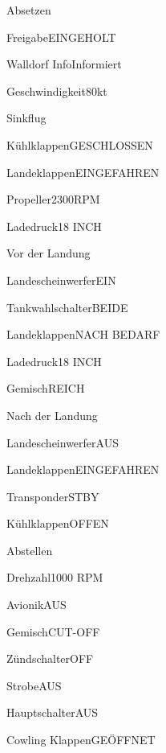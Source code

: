 \begin{task}
  \begin{checklist}{Absetzen}
    \item{Freigabe}{EINGEHOLT}
    \item{Walldorf Info}{Informiert}
    \item{Geschwindigkeit}{80kt}
  \end{checklist}
\end{task}

\begin{task}
  \begin{checklist}{Sinkflug}
    \item{Kühlklappen}{GESCHLOSSEN}
    \item{Landeklappen}{EINGEFAHREN}
    \item{Propeller}{2300RPM}
    \item{Ladedruck}{18 INCH}
    \item{}{}
  \end{checklist}
\end{task}

\begin{task}
  \begin{checklist}{Vor der Landung}
    \item{Landescheinwerfer}{EIN}
    \item{Tankwahlschalter}{BEIDE}
    \item{Landeklappen}{NACH BEDARF}
    \item{Ladedruck}{18 INCH}
    \item{Gemisch}{REICH}
  \end{checklist}
\end{task}

\begin{task}
  \begin{checklist}{Nach der Landung}
    \item{Landescheinwerfer}{AUS}
    \item{Landeklappen}{EINGEFAHREN}
    \item{Transponder}{STBY}
    \item{Kühlklappen}{OFFEN}
  \end{checklist}
\end{task}

\begin{task}
  \begin{checklist}{Abstellen}
    \item{Drehzahl}{1000 RPM}
    \item{Avionik}{AUS}
    \item{Gemisch}{CUT-OFF}
    \item{Zündschalter}{OFF}
    \item{Strobe}{AUS}
    \item{Hauptschalter}{AUS}
    \item{Cowling Klappen}{GEÖFFNET}
  \end{checklist}
\end{task}


